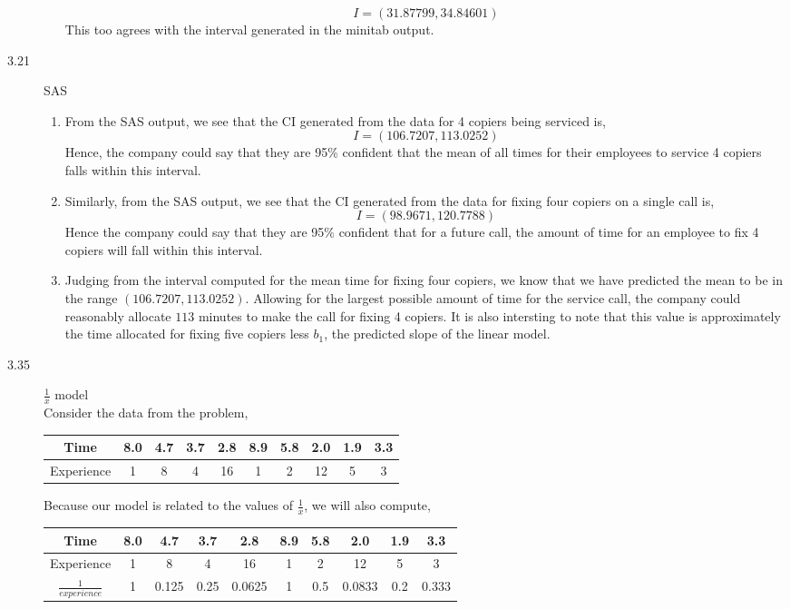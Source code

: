 \documentclass[letterpaper,10pt]{article}
\begin{document}
\begin{description}
\begin{enumerate}[label=\alph*.]
\[I=(31.87799,34.84601)\]
This too agrees with the interval generated in the minitab output.
\end{enumerate}
\item[3.21] SAS
\begin{enumerate}[label=\alph*.]
\item From the SAS output, we see that the CI generated from the data for 4 copiers being serviced is,
\[I=(106.7207, 113.0252)\]
Hence, the company could say that they are 95\% confident that the mean of all times for their employees to service 4 copiers falls within this interval.
\item Similarly, from the SAS output, we see that the CI generated from the data for fixing four copiers on a single call is,
\[I=(98.9671,120.7788)\]
Hence the company could say that they are 95\% confident that for a future call, the amount of time for an employee to fix 4 copiers will fall within this interval.
\item Judging from the interval computed for the mean time for fixing four copiers, we know that we have predicted the mean to be in the range $(106.7207, 113.0252)$. Allowing for the largest possible amount of time for the service call, the company could reasonably allocate $113$ minutes to make the call for fixing 4 copiers. It is also intersting to note that this value is approximately the time allocated for fixing five copiers less $b_1$, the predicted slope of the linear model.
\end{enumerate}
\item[3.35] $\frac{1}{x}$ model\\
Consider the data from the problem,
\begin{center}
\begin{tabular}{c|c|c|c|c|c|c|c|c|c|}
Time & 8.0 & 4.7 & 3.7 & 2.8 & 8.9 & 5.8 & 2.0 & 1.9 & 3.3 \\\hline
Experience & 1 & 8 & 4 & 16 & 1 & 2 & 12 & 5 & 3
\end{tabular}
\end{center}
Because our model is related to the values of $\frac{1}{x}$, we will also compute,
\begin{center}
\begin{tabular}{c|c|c|c|c|c|c|c|c|c|}
Time & 8.0 & 4.7 & 3.7 & 2.8 & 8.9 & 5.8 & 2.0 & 1.9 & 3.3 \\\hline
Experience & 1 & 8 & 4 & 16 & 1 & 2 & 12 & 5 & 3\\\hline
$\frac{1}{experience}$ & 1 & 0.125 & 0.25 & 0.0625 & 1 & 0.5 & 0.0833 & 0.2 & 0.333
\end{tabular}

\end{center}
\end{description}
\end{document}
